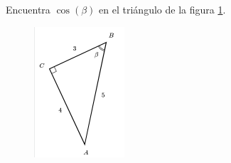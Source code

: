 \question[15] Encuentra $\cos(\beta)$ en el triángulo de la figura \ref{fig:functrig01}.
\begin{figure}[H]
    \begin{center}
        \includegraphics[width=0.3\textwidth]{../images/functrig01.png}
    \end{center}
    \caption{}
    \label{fig:functrig01}
\end{figure}
